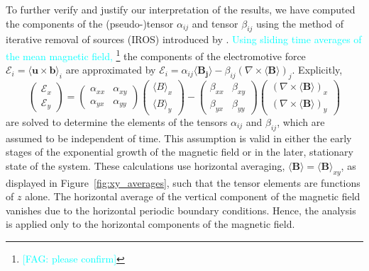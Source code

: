 \documentclass[fleqn,usenatbib]{mnras}
\newcommand{\fg}[1]{\textcolor{cyan}{#1}} %
\newcommand{\fag}[1]{\textcolor{cyan}{[FAG: #1]}} %
\newcommand\mean[1]{\langle #1\rangle}%
\newcommand\meanh[1]{{\langle #1\rangle}_{xy}}%
\renewcommand\vec[1]{\bm{#1}}%
\begin{document}
To further verify and justify our interpretation of the results, we have
computed the components of the (pseudo-)tensor $\alpha_{ij}$ and tensor
$\beta_{ij}$ using the method of iterative removal of sources (IROS) introduced
by \citet{bendre2023iterative}. \fg{Using sliding time averages of the mean
magnetic field, \footnote{\fag{please confirm}}} the components of the electromotive force
$\mathcal{E}_i = \langle \vec{u}\times\vec{b} \rangle_i$ are approximated by
$\mathcal{E}_i = \alpha_{ij}\langle \vec{B_j}\rangle - \beta_{ij}(\nabla\times
\langle \vec{B} \rangle)_j$. Explicitly,
\begin{equation}\label{EMF}
\begin{pmatrix} \mathcal{E}_x\\ \mathcal{E}_y\end{pmatrix}
=\begin{pmatrix} \alpha_{xx} &\alpha_{xy}\\ \alpha_{yx} &\alpha_{yy} \end{pmatrix}
\begin{pmatrix} \mean{B}_x \\ \mean{B}_y \end{pmatrix}
-\begin{pmatrix} \beta_{xx} &\beta_{xy}\\ \beta_{yx} &\beta_{yy} \end{pmatrix}
\begin{pmatrix} (\nabla\times\mean{\vec{B}})_x \\ (\nabla\times\mean{\vec{B}})_y \end{pmatrix}
\end{equation}
are solved to determine the elements of the tensors $\alpha_{ij}$ and
$\beta_{ij}$, which are assumed to be independent of time. This assumption is
valid in either the early stages of the exponential growth of the magnetic
field or in the later, stationary state of the system. {These} calculations
{use} horizontal averaging{,} $\mean{\vec{B}}=\meanh{\vec{B}}$, as
displayed in Figure~\ref{fig:xy_averages}, such that the tensor elements are
functions of $z$ alone.  The horizontal average of the vertical component of
the magnetic field vanishes due to the horizontal periodic boundary conditions.
Hence, the analysis is applied only to the horizontal components of the
magnetic field.
\end{document}
